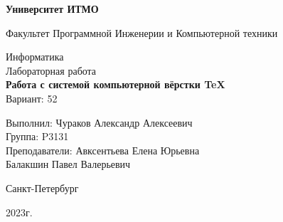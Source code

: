 \thispagestyle{empty}
\begin{center}
    \textbf{Университет ИТМО}

    \vspace{1em}
    Факультет Программной Инженерии и Компьютерной техники

    \vspace{20em}
    
    {\Large Информатика}\\[1em]
    {\Large Лабораторная работа }\\[1em]
    {\Large \textbf{Работа с системой компьютерной вёрстки \TeX}}\\[1em]
    Вариант: 52
\end{center}

\vspace{12em}

\begin{flushright}
    Выполнил:
    Чураков Александр Алексеевич\\
    Группа: P3131\\
    Преподаватели:
    Авксентьева Елена Юрьевна\\
    Балакшин Павел Валерьевич \\
\end{flushright}
\vspace{8em}
\vspace{\fill}

\begin{center}
Санкт-Петербург

2023г.
\end{center}